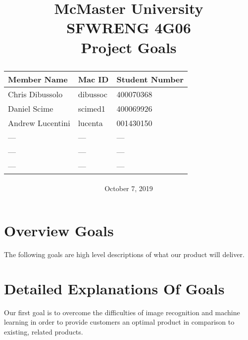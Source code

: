 \documentclass[12pt, titlepage]{article}
\title{
McMaster University\\
SFWRENG 4G06\\
\bigskip\bigskip\bigskip
{\bf Project Goals\\}
\bigskip\bigskip\bigskip\bigskip
\begin{table}[h!]
\begin{center}
\begin{tabular}{|p{5cm}|p{5cm}|p{5cm}|}
	\hline
	\bf Member Name & \bf Mac ID & \bf Student Number\\
	\hline
	\hline
	Chris Dibussolo & dibussoc & 400070368\\
	\hline
	Daniel Scime & scimed1 & 400069926\\
	\hline
  	Andrew Lucentini & lucenta & 001430150\\
	\hline
  --- & --- & ---\\
	\hline
  --- & --- & ---\\
	\hline
  --- & --- & ---\\
	\hline
\end{tabular}
\end{center}
\end{table}
\date{October 7, 2019}
}
\begin{document}
\maketitle

\newpage


\section{Overview Goals}

The following goals are high level descriptions of what our product will deliver.

\section{Detailed Explanations Of Goals}

Our first goal is to overcome the difficulties of image recognition and machine learning in order to provide customers an optimal product in comparison to existing, related products.
\end{document}
